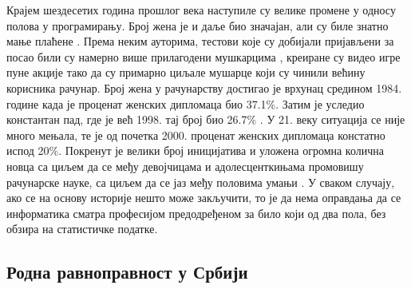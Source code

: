 \documentclass[a4paper]{article}
\begin{document}
\newpage
Крајем шездесетих година прошлог века наступиле су велике промене у односу полова у програмирању. 
Број жена је и даље био значајан, али су биле знатно мање плаћене \cite{women_education_it} 
\cite{women_price}. Према неким ауторима, тестови које су добијали пријављени за посао били су 
намерно више прилагодени мушкарцима \cite{women_price}, креиране су видео игре пуне акције тако да
су примарно циљале мушарце који су чинили већину корисника рачунар. Број жена у рачунарству 
достигао је врхунац средином 1984. године када је проценат женских дипломаца био 37.1\%. Затим је
уследио константан пад, где је већ 1998. тај број био 26.7\% \cite{women_procent}. У 21. веку 
ситуација се није много мењала, те је од почетка 2000. проценат женских дипломаца констатно испод 
20\%. Покренут је велики број иницијатива и уложена огромна колична новца са циљем да се међу 
девојчицама и адолесценткињама промовишу рачунарске науке, са циљем да се јаз међу половима умањи 
\cite{smanjenje_jaza}. У сваком случају, ако се на основу историје нешто може закључити, то је да 
нема оправдања да се информатика сматра професијом предодређеном за било који од два пола, без 
обзира на статистичке податке.


\subsection{Родна равноправност у Србији}
\end{document}
